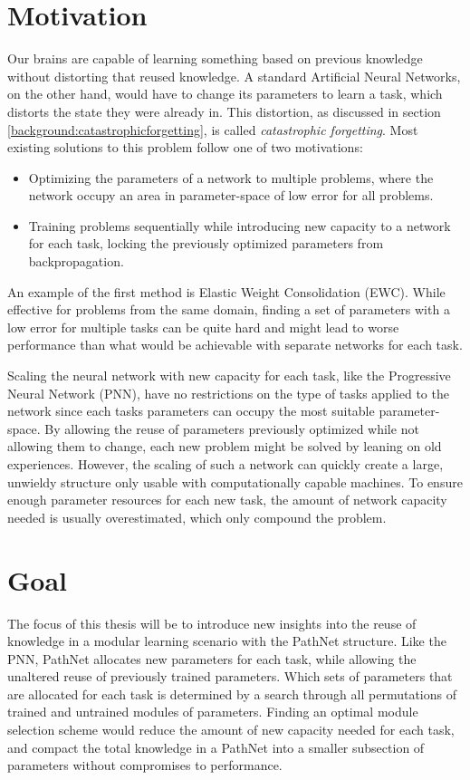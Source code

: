 \section{Motivation}
Our brains are capable of learning something based on previous knowledge without distorting that reused knowledge. A standard Artificial Neural Networks, on the other hand, would have to change its parameters to learn a task, which distorts the state they were already in. This distortion, as discussed in section \ref{background:catastrophicforgetting}, is called \textit{catastrophic forgetting}. Most existing solutions to this problem follow one of two motivations: 
\begin{itemize}
    \item Optimizing the parameters of a network to multiple problems, where the network occupy an area in parameter-space of low error for all problems. 
    \item Training problems sequentially while introducing new capacity to a network for each task, locking the previously optimized parameters from backpropagation. 
\end{itemize}

An example of the first method is Elastic Weight Consolidation\cite{ewc} (EWC). While effective for problems from the same domain, finding a set of parameters with a low error for multiple tasks can be quite hard and might lead to worse performance than what would be achievable with separate networks for each task.

Scaling the neural network with new capacity for each task, like the Progressive Neural Network\cite{progressiveneuralnetworks} (PNN), have no restrictions on the type of tasks applied to the network since each tasks parameters can occupy the most suitable parameter-space. By allowing the reuse of parameters previously optimized while not allowing them to change, each new problem might be solved by leaning on old experiences. However, the scaling of such a network can quickly create a large, unwieldy structure only usable with computationally capable machines. To ensure enough parameter resources for each new task, the amount of network capacity needed is usually overestimated, which only compound the problem. 

\section{Goal}
The focus of this thesis will be to introduce new insights into the reuse of knowledge in a modular learning scenario with the PathNet structure\cite{pathnet}. Like the PNN, PathNet allocates new parameters for each task, while allowing the unaltered reuse of previously trained parameters. Which sets of parameters that are allocated for each task is determined by a search through all permutations of trained and untrained modules of parameters. Finding an optimal module selection scheme would reduce the amount of new capacity needed for each task, and compact the total knowledge in a PathNet into a smaller subsection of parameters without compromises to performance. 

